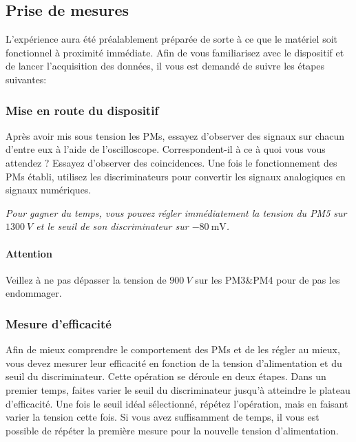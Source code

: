 \subsection{Prise de mesures}
L'expérience aura été préalablement préparée de sorte à ce que le matériel soit fonctionnel à proximité immédiate.
Afin de vous familiarisez avec le dispositif et de lancer l'acquisition des données, il vous est demandé de suivre les étapes suivantes:

\begin{center}
\end{center}

\subsubsection{Mise en route du dispositif}

Après avoir mis sous tension les PMs, essayez d'observer des signaux sur chacun d'entre eux à l'aide de l'oscilloscope.
Correspondent-il à ce à quoi vous vous attendez ?
Essayez d'observer des coincidences.
Une fois le fonctionnement des PMs établi, utilisez les discriminateurs pour convertir les signaux analogiques en signaux numériques.

\textit{Pour gagner du temps, vous pouvez régler immédiatement la tension du PM5 sur \(\SI{1300}{V}\) et le seuil de son discriminateur sur \(\SI{-80}{\mV}\).}

\paragraph{Attention} Veillez à ne pas dépasser la tension de \(\SI{900}{V}\) sur les PM3\&PM4 pour de pas les endommager.

\subsubsection{Mesure d'efficacité}
Afin de mieux comprendre le comportement des PMs et de les régler au mieux, vous devez mesurer leur efficacité en fonction de la tension d'alimentation et du seuil du discriminateur.
Cette opération se déroule en deux étapes.
Dans un premier temps, faites varier le seuil du discriminateur jusqu'à atteindre le plateau d'efficacité.
Une fois le seuil idéal sélectionné, répétez l'opération, mais en faisant varier la tension cette fois.
Si vous avez suffisamment de temps, il vous est possible de répéter la première mesure pour la nouvelle tension d'alimentation.

